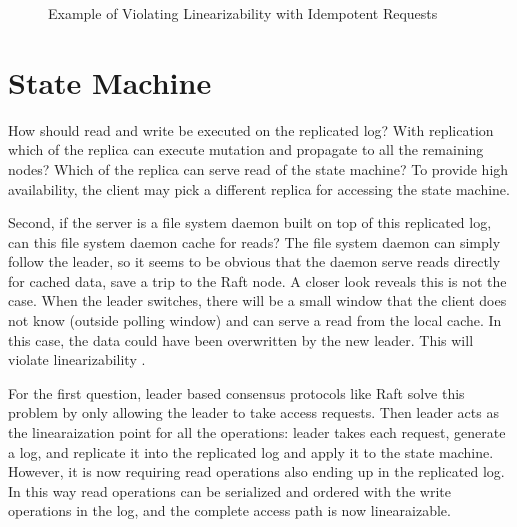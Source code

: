 \begin{figure}
\caption{Example of Violating Linearizability with Idempotent Requests}
\label{fig:M1}
\end{figure}


\section{State Machine \LConsistent}\label{sml}
How should read and write be executed on the replicated log?
With replication which of the replica can execute mutation and propagate to
all the remaining nodes? Which of the replica can serve read of the state
machine? To provide high availability, the client may pick a different
replica for accessing the state machine.

Second, if the server is a file system daemon built on top of this
replicated log, can this file system daemon cache for reads? The file system
daemon can simply follow the leader, so it seems to be obvious that the
daemon serve reads directly for cached data, save a trip to the Raft node. A
closer look reveals this is not the case. When the leader switches, there
will be a small window that the client does not know (outside polling window)
and can serve a read from the local cache. In this case, the data could have
been overwritten by the new leader. This will violate linearizability .

For the first question, leader based consensus protocols like Raft solve this
problem by only allowing the leader to take access requests. Then leader acts
as the linearaization point for all the operations: leader takes each
request, generate a log, and replicate it into the replicated log and apply
it to the state machine. However, it is now requiring read operations also
ending up in the replicated log. In this way read operations can be
serialized and ordered with the write operations in the log, and the complete
access path is now linearaizable.


